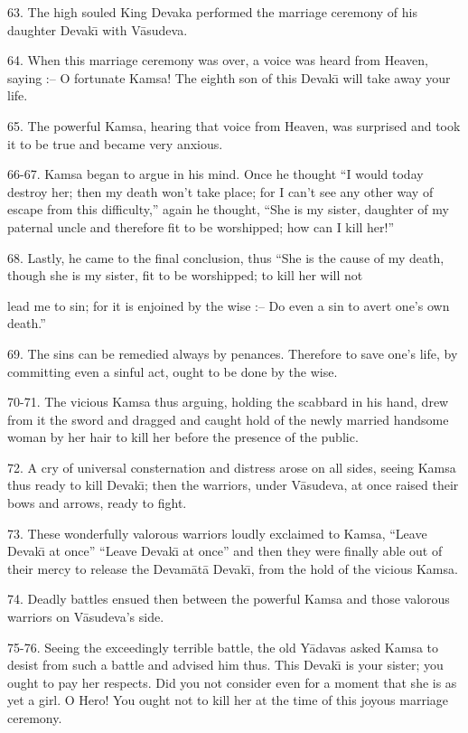 63. The high souled King Devaka performed the marriage ceremony of his daughter Devak\={\i} with V\=asudeva.

64. When this marriage ceremony was over, a voice was heard from Heaven, saying :-- O fortunate Kamsa! The eighth son of this Devak\={\i} will take away your life.

65. The powerful Kamsa, hearing that voice from Heaven, was surprised and took it to be true and became very anxious.

66-67. Kamsa began to argue in his mind. Once he thought ``I would today destroy her; then my death won't take place; for I can't see any other way of escape from this difficulty,'' again he thought, ``She is my sister, daughter of my paternal uncle and therefore fit to be worshipped; how can I kill her!''

68. Lastly, he came to the final conclusion, thus ``She is the cause of my death, though she is my sister, fit to be worshipped; to kill her will not

lead me to sin; for it is enjoined by the wise :-- Do even a sin to avert one's own death.''

69. The sins can be remedied always by penances. Therefore to save one's life, by committing even a sinful act, ought to be done by the wise.

70-71. The vicious Kamsa thus arguing, holding the scabbard in his hand, drew from it the sword and dragged and caught hold of the newly married handsome woman by her hair to kill her before the presence of the public.

72. A cry of universal consternation and distress arose on all sides, seeing Kamsa thus ready to kill Devak\={\i}; then the warriors, under V\=asudeva, at once raised their bows and arrows, ready to fight.

73. These wonderfully valorous warriors loudly exclaimed to Kamsa, ``Leave Devak\={\i} at once'' ``Leave Devak\={\i} at once'' and then they were finally able out of their mercy to release the Devam\=at\=a Devak\={\i}, from the hold of the vicious Kamsa.

74. Deadly battles ensued then between the powerful Kamsa and those valorous warriors on V\=asudeva's side.

75-76. Seeing the exceedingly terrible battle, the old Y\=adavas asked Kamsa to desist from such a battle and advised him thus. This Devak\={\i} is your sister; you ought to pay her respects. Did you not consider even for a moment that she is as yet a girl. O Hero! You ought not to kill her at the time of this joyous marriage ceremony.

